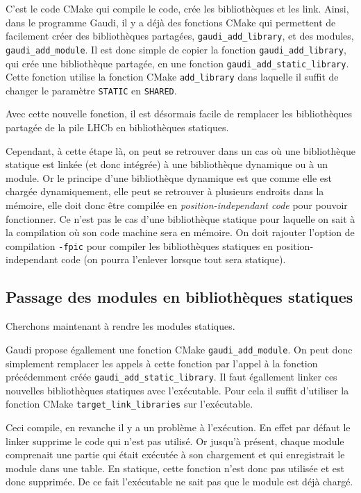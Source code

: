 \documentclass[a4paper]{report}
\begin{document}
C'est le code CMake qui compile le code, crée les bibliothèques et les link.
Ainsi, dans le programme Gaudi, il y a déjà des fonctions CMake qui permettent de facilement créer des bibliothèques partagées, \verb'gaudi_add_library', et des modules, \verb'gaudi_add_module'.
Il est donc simple de copier la fonction \verb'gaudi_add_library', qui crée une bibliothèque partagée, en une fonction \verb'gaudi_add_static_library'.
Cette fonction utilise la fonction CMake \verb'add_library' dans laquelle il suffit de changer le paramètre \verb'STATIC' en \verb'SHARED'.

Avec cette nouvelle fonction, il est désormais facile de remplacer les bibliothèques partagée de la pile LHCb en bibliothèques statiques.

Cependant, à cette étape là, on peut se retrouver dans un cas où une bibliothèque statique est linkée (et donc intégrée) à une bibliothèque dynamique ou à un module.
Or le principe d'une bibliothèque dynamique est que comme elle est chargée dynamiquement, elle peut se retrouver à plusieurs endroits dans la mémoire, elle doit donc être compilée en \emph{position-independant code} pour pouvoir fonctionner.
Ce n'est pas le cas d'une bibliothèque statique pour laquelle on sait à la compilation où son code machine sera en mémoire.
On doit rajouter l'option de compilation \verb'-fpic' pour compiler les bibliothèques statiques en position-independant code (on pourra l'enlever lorsque tout sera statique).

\subsection{Passage des modules en bibliothèques statiques}
Cherchons maintenant à rendre les modules statiques.

Gaudi propose égallement une fonction CMake \verb'gaudi_add_module'.
On peut donc simplement remplacer les appels à cette fonction par l'appel à la fonction précédemment créée \verb'gaudi_add_static_library'.
Il faut égallement linker ces nouvelles bibliothèques statiques avec l'exécutable.
Pour cela il suffit d'utiliser la fonction CMake \verb'target_link_libraries' sur l'exécutable.

Ceci compile, en revanche il y a un problème à l'exécution.
En effet par défaut le linker supprime le code qui n'est pas utilisé.
Or jusqu'à présent, chaque module comprenait une partie qui était exécutée à son chargement et qui enregistrait le module dans une table.
En statique, cette fonction n'est donc pas utilisée et est donc supprimée.
De ce fait l'exécutable ne sait pas que le module est déjà chargé.
\end{document}
